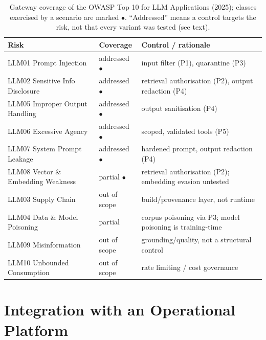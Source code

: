 \documentclass[conference]{IEEEtran}
\begin{document}
\begin{table}[t]
\centering
\caption{Gateway coverage of the OWASP Top 10 for LLM Applications (2025); classes exercised by a scenario are marked $\bullet$. ``Addressed'' means a control targets the risk, not that every
variant was tested (see text).}
\label{tab:owasp}
\footnotesize
\setlength{\tabcolsep}{3pt}
\begin{tabular}{@{}p{2.55cm}p{1.35cm}p{3.75cm}@{}}
\toprule
Risk & Coverage & Control / rationale \\
\midrule
LLM01 Prompt Injection            & addressed $\bullet$ & input filter (P1), quarantine (P3) \\
LLM02 Sensitive Info Disclosure   & addressed $\bullet$ & retrieval authorisation (P2), output redaction (P4) \\
LLM05 Improper Output Handling    & addressed $\bullet$ & output sanitisation (P4) \\
LLM06 Excessive Agency            & addressed $\bullet$ & scoped, validated tools (P5) \\
LLM07 System Prompt Leakage       & addressed $\bullet$ & hardened prompt, output redaction (P4) \\
LLM08 Vector \& Embedding Weakness & partial $\bullet$ & retrieval authorisation (P2); embedding evasion untested \\
LLM03 Supply Chain                & out of scope & build/provenance layer, not runtime \\
LLM04 Data \& Model Poisoning     & partial      & corpus poisoning via P3; model poisoning is training-time \\
LLM09 Misinformation              & out of scope & grounding/quality, not a structural control \\
LLM10 Unbounded Consumption       & out of scope & rate limiting / cost governance \\
\bottomrule
\end{tabular}
\end{table}

\section{Integration with an Operational Platform}
\label{sec:deployment}
\end{document}
